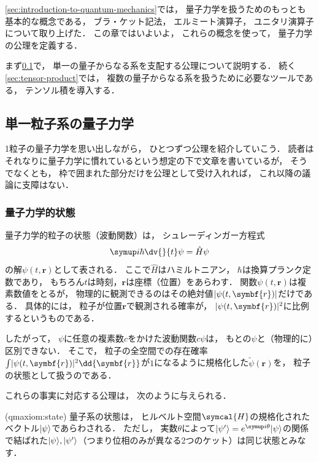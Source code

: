 \documentclass[
]{sotsu}
\begin{document}
\cref{sec:introduction-to-quantum-mechanics}では，
量子力学を扱うためのもっとも基本的な概念である，
ブラ・ケット記法，
エルミート演算子，
ユニタリ演算子について取り上げた．
この章ではいよいよ，
これらの概念を使って，
量子力学の公理を定義する．

まず\cref{sec:quantum-axiom-of-one-body}で，
単一の量子からなる系を支配する公理について説明する．
続く\cref{sec:tensor-product}では，
複数の量子からなる系を扱うために必要なツールである，
テンソル積を導入する．




\subsection{単一粒子系の量子力学}
\label{sec:quantum-axiom-of-one-body}

1粒子の量子力学を思い出しながら，
ひとつずつ公理を紹介していこう．
読者はそれなりに量子力学に慣れているという想定の下で文章を書いているが，
そうでなくとも，
枠で囲まれた部分だけを公理として受け入れれば，
これ以降の議論に支障はない．





\subsubsection{量子力学的状態}

量子力学的粒子の状態（波動関数）は，
シュレーディンガー方程式
\begin{equation}
    \label{eq:Schroedinger-eq-depending-on-time}
    \iu \hbar \dv{}{t} \psi = \hat{H} \psi
\end{equation}
の解$\psi (t, \symbf{r})$として表される．
ここで$\hat{H}$はハミルトニアン，
$\hbar$は換算プランク定数であり，
もちろん$t$は時刻，$\symbf{r}$は座標（位置）をあらわす．
関数$\psi (t, \symbf{r})$は複素数値をとるが，
物理的に観測できるのはその絶対値$\abs{\psi (t, \symbf{r})}$だけである．
具体的には，
粒子が位置$\symbf{r}$で観測される確率が，
$\abs{\psi (t, \symbf{r})}^2$に比例するというものである．

したがって，
$\psi$に任意の複素数$c$をかけた波動関数$c \psi$は，
もとの$\psi$と（物理的に）区別できない．
そこで，
粒子の全空間での存在確率$\int \abs{\psi (t, \symbf{r})}^2 \dd{\symbf{r}}$が$1$になるように規格化した$\tilde{\psi} (\symbf{r})$を，
粒子の状態として扱うのである．

これらの事実に対応する公理は，
次のように与えられる．

\begin{qmaxiom}[状態ベクトル](qmaxiom:state)
    量子系の状態は，
    ヒルベルト空間$\symcal{H}$の規格化されたベクトル$\ket{\psi}$であらわされる．
    ただし，
    実数$\theta$によって$\ket{\psi'} = e^{\iu \theta} \ket{\psi}$の関係で結ばれた$\ket{\psi}, \ket{\psi'}$（つまり位相のみが異なる2つのケット）は同じ状態とみなす．    
\end{qmaxiom}
\end{document}
